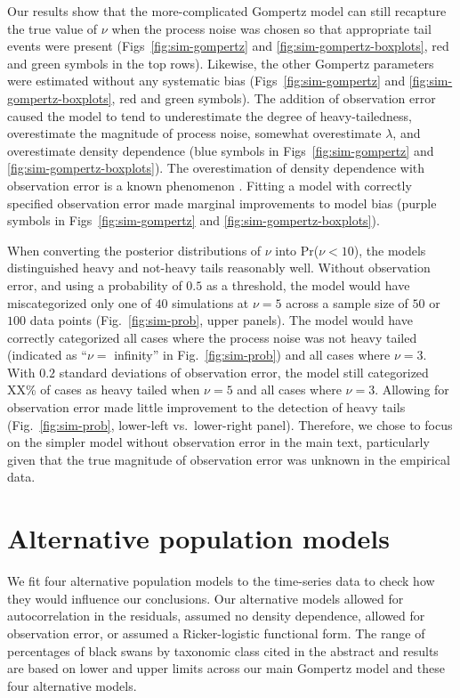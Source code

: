 Our results show that the more-complicated Gompertz model can still recapture
the true value of $\nu$ when the process noise was chosen so that appropriate
tail events were present (Figs~\ref{fig:sim-gompertz} and
\ref{fig:sim-gompertz-boxplots}, red and green symbols in the top rows).
Likewise, the other Gompertz parameters were estimated without any systematic
bias (Figs~\ref{fig:sim-gompertz} and \ref{fig:sim-gompertz-boxplots}, red and
green symbols). The addition of observation error caused the model to tend to
underestimate the degree of heavy-tailedness, overestimate the magnitude of
process noise, somewhat overestimate $\lambda$, and overestimate density
dependence (blue symbols in Figs~\ref{fig:sim-gompertz} and
\ref{fig:sim-gompertz-boxplots}). The overestimation of density dependence with
observation error is a known phenomenon \citep{knape2012}. Fitting a model with
correctly specified observation error made marginal improvements to model
bias (purple symbols in Figs~\ref{fig:sim-gompertz} and
\ref{fig:sim-gompertz-boxplots}).

When converting the posterior distributions of $\nu$ into Pr($\nu < 10$), the
models distinguished heavy and not-heavy tails reasonably well. Without
observation error, and using a probability of $0.5$ as a threshold, the model
would have miscategorized only one of $40$ simulations at $\nu = 5$ across
a sample size of $50$ or $100$ data points (Fig.~\ref{fig:sim-prob}, upper
panels). The model would have correctly categorized all cases where the process
noise was not heavy tailed (indicated as ``$\nu =$ infinity'' in
Fig.~\ref{fig:sim-prob}) and all cases where $\nu = 3$. With $0.2$ standard
deviations of observation error, the model still categorized XX\% of cases as
heavy tailed when $\nu = 5$ and all cases where $\nu = 3$. Allowing for
observation error made little improvement to the detection of heavy tails
(Fig.~\ref{fig:sim-prob}, lower-left vs.\ lower-right panel). Therefore, we
chose to focus on the simpler model without observation error in the main
text, particularly given that the true magnitude of observation error was
unknown in the empirical data.

\section{Alternative population models}

We fit four alternative population models to the time-series data to check how
they would influence our conclusions. Our alternative models allowed for
autocorrelation in the residuals, assumed no density dependence, allowed for
observation error, or assumed a Ricker-logistic functional form. The range of
percentages of black swans by taxonomic class cited in the abstract and results
are based on lower and upper limits across our main Gompertz model and these
four alternative models.

